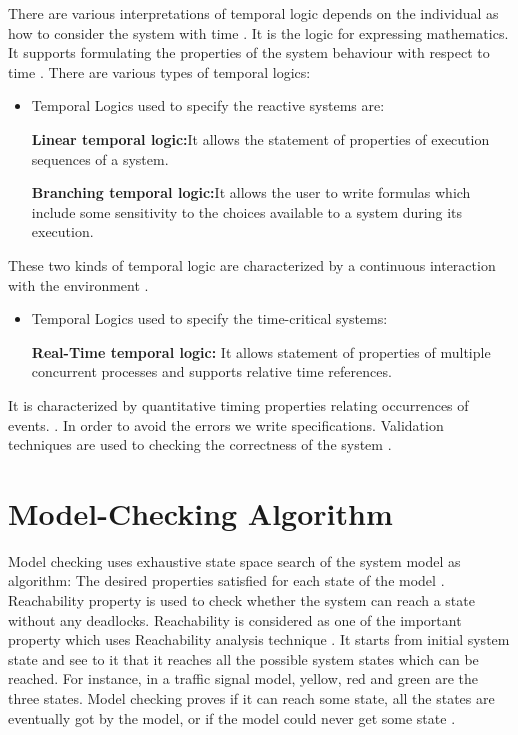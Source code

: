 \documentclass[a4paper,12pt]{report}
\begin{document}
There are various interpretations of temporal logic depends on the individual as how to consider the system with time \cite{B.Berard2001}. It is the logic for expressing mathematics. It supports formulating the properties of the system behaviour with respect to time \cite{B.Berard2001}. There are various types of temporal logics:
\begin{itemize}
\item Temporal Logics used to specify the reactive systems are:

\textbf{Linear temporal logic:}It allows the statement of properties of execution sequences of a system.

 \textbf{Branching temporal logic:}It allows the user to write formulas which include some sensitivity to the choices available to a system during its execution.
\end{itemize}
 These two kinds of temporal logic are characterized by a continuous interaction with the environment \cite{DawsonEngler}.
\begin{itemize}
\item Temporal Logics used to specify the time-critical systems:

 \textbf{Real-Time temporal logic:}  It allows statement of properties of multiple concurrent processes and supports relative time references.
\end{itemize}

It is characterized by quantitative timing properties relating occurrences of events. \cite{DawsonEngler}.
In order to avoid the errors we write specifications. Validation techniques are used to checking the correctness of the system \cite{Wang2007}.  

\section{Model-Checking Algorithm}
\label{Model chec Algo}

Model checking uses exhaustive state space search of the system model as algorithm: The desired properties satisfied for each state of the model \cite{B.Berard2001}. Reachability property is used to check whether the system can reach a state without any deadlocks. Reachability is considered as one of the important property which uses Reachability analysis technique \cite{M.Davis1962}. It starts from initial system state and see to it that it reaches all the possible system states which can be reached. For instance, in a traffic signal model, yellow, red and green are the three states. Model checking proves if it can reach some state, all the states are eventually got by the model, or if the model could never get some state \cite{M.Davis1962}.
\end{document}
